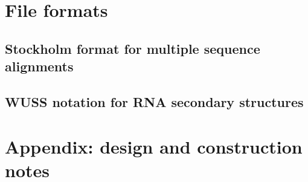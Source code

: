 \documentclass[10pt]{book}
\begin{document}
\newpage
\chapter{File formats}

\section{Stockholm format for multiple sequence alignments}




\newpage
\section{WUSS notation for RNA secondary structures}




\newpage
\chapter{Appendix: design and construction notes}




\newpage
\newcommand{\bibfont}{\footnotesize}


\end{document}
